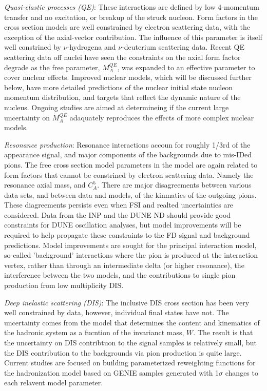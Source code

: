   \emph{Quasi-elastic processes (QE)}: These interactions are defined by low 4-momentum transfer and no excitation,
  or breakup of the struck nucleon. Form factors in the cross section models are well constrained by 
  electron scattering data, with the exception of the axial-vector contribution. The influence of this 
  parameter is itself well constrined by $\nu$-hydrogena and $\nu$-deuterium scattering data. Recent QE
  scattering data off nuclei have seen the constraints on the axial form factor degrade as the free
  parameter, $M_{A}^{QE}$, was expanded to an effective parameter to cover nuclear effects. 
  Improved nuclear models, which will be discussed further below, have more detailed predictions
  of the nuclear initial state nucleon momentum distribution, and targets that reflect the dynamic
  nature of the nucleus. Ongoing studies are aimed at determineing if the current large uncertainty 
  on $M_{A}^{QE}$ adaquately reproduces the effects of more complex nuclear models.

  \emph{Resonance production}: Resonance interactions accoun for roughly 1/3rd of the \nue appearance
  signal, and major components of the backgrounds due to mis-IDed pions. The free cross section model
  parameters in the model are again related to form factors that cannot be constrined by electron
  scattering data. Namely the resonance axial mass, and $C^{5}_{A}$. 
  There are major disagreements between various data sets, and between data and models, of the 
  kinmatics of the outgoing pions. These diagreements persists even when FSI and realted uncertainties
  are considered. Data from the INP and the DUNE ND should provide good constraints for DUNE
  oscillation analyses, but model improvements will be required to help propagate these constraints
  to the FD signal and background predictions. Model improvements are sought for the principal interaction
  model, so-called 'background' interactions where the pion is produced at the interaction vertex, 
  rather than through an intermediate delta (or higher resonance), the interference between the two
  models, and the contributions to single pion production from low multiplicity DIS.

  \emph{Deep inelastic scattering (DIS)}: The inclusive DIS cross section has been very well constrained by 
  data, however, individual final states have not. The uncertainty comes from the model that determines the
  content and kinematics of the hadronic system as a fucntion of the invarianct mass, $W$. The result is that
  the uncertainty on DIS contribtuon to the signal samples is relatively small, but the DIS contribution to the
  backgrounds via pion production is quite large. Current studies are focused on building parameterized reweighting 
  functions for the hadronization model based on GENIE samples generated with 1$\sigma$ changes to each relavent 
  model parameter.


